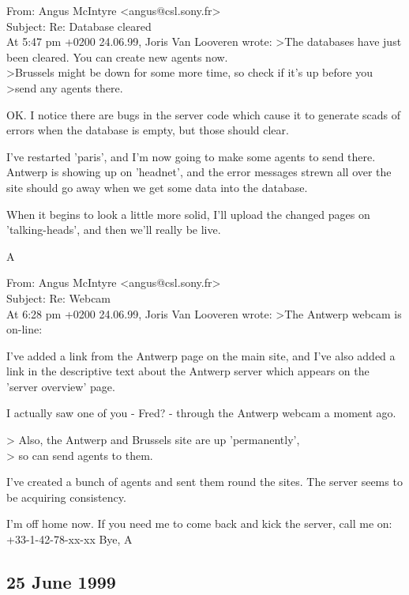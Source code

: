 \begin{mail}
From: Angus McIntyre <angus@csl.sony.fr>\\
Subject: Re: Database cleared\\

At 5:47 pm +0200 24.06.99, Joris Van Looveren wrote:
>The databases have just been cleared. You can create new agents now.
\\>Brussels might be down for some more time, so check if it's up before you
\\>send any agents there.

OK. I notice there are bugs in the server code which cause it to 
generate scads of errors when the database is empty, but those should clear.

I've restarted 'paris', and I'm now going to make some agents to 
send there. Antwerp is showing up on 'headnet', and the error 
messages strewn all over the site should go away when we get 
some data into the database.

When it begins to look a little more solid, I'll upload the 
changed pages on 'talking-heads', and then we'll really be live.

	A
\end{mail}
\begin{mail}
From: Angus McIntyre <angus@csl.sony.fr>\\
Subject: Re: Webcam\\

At 6:28 pm +0200 24.06.99, Joris Van Looveren wrote:
>The Antwerp webcam is on-line:

I've added a link from the Antwerp page on the main site, 
and I've also added a link in the descriptive text about 
the Antwerp server which appears on the 'server overview' page. 

I actually saw one of you - Fred? - through the Antwerp 
webcam a moment ago.

> Also, the Antwerp and Brussels site are up 'permanently', 
\\> so can send agents to them.

I've created a bunch of agents and sent them round the sites. 
The server seems to be acquiring consistency.

I'm off home now. If you need me to come back and kick 
the server, call me on:
	+33-1-42-78-xx-xx 
Bye,
	A
\end{mail}

\clearpage
\subsection*{25 June 1999} 

